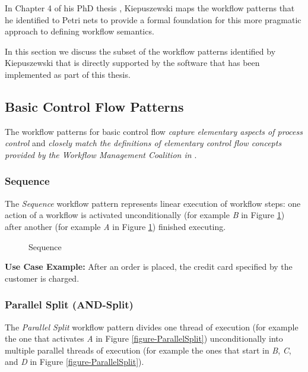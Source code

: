 In Chapter 4 of his PhD thesis \cite{BK03}, Kiepuszewski maps the workflow
patterns that he identified to Petri nets to provide a formal foundation for
this more pragmatic approach to defining workflow semantics.

In this section we discuss the subset of the workflow patterns identified by
Kiepuszewski that is directly supported by the software that has been
implemented as part of this thesis.

\subsection{Basic Control Flow Patterns}
\label{subsection-BasicControlFlowPatterns}

The workflow patterns for basic control flow \emph{capture elementary aspects
of process control} and \emph{closely match the definitions of elementary
control flow concepts provided by the Workflow Management Coalition in
\cite{WfMC95,WfMC99}}.

\subsubsection{Sequence}

The \emph{Sequence} workflow pattern represents linear execution of workflow
steps: one action of a workflow is activated unconditionally (for example
\emph{B} in Figure \ref{figure-Sequence}) after another (for example \emph{A}
in Figure \ref{figure-Sequence}) finished executing.

\begin{figure}[hbt]
\begin{center}
\end{center}
\caption[The \emph{Sequence} workflow pattern]{Sequence}
\label{figure-Sequence}
\end{figure}

\textbf{Use Case Example:} After an order is placed, the credit card specified by the
customer is charged. 

\subsubsection{Parallel Split (AND-Split)}

The \emph{Parallel Split} workflow pattern divides one thread of execution
(for example the one that activates \emph{A} in Figure
\ref{figure-ParallelSplit}) unconditionally into multiple parallel threads of
execution (for example the ones that start in \emph{B}, \emph{C}, and \emph{D}
in Figure \ref{figure-ParallelSplit}).

